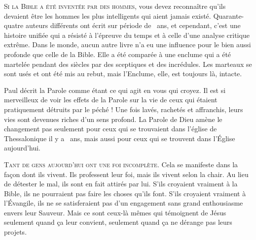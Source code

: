 \lettrine{S}{i la Bible a été inventée par des hommes,} vous devez reconnaître
 qu'ils devaient être les hommes les plus intelligents qui aient jamais existé.
 Quarante-quatre auteurs différents ont écrit
 sur période de ~ans, et cependant, c'est une histoire unifiée
 qui a résisté à l'épreuve du temps et à celle d'une analyse critique extrême.
 Dans le monde, aucun autre livre n'a eu une influence pour le bien aussi
 profonde que celle de la Bible. Elle a été comparée à une enclume
 qui a été martelée pendant des siècles par des sceptiques et des incrédules.
 Les marteaux se sont usés et ont été mis au rebut, mais l'Enclume,
 elle, est toujours là, intacte.


Paul décrit la Parole comme étant ce qui \og agit en vous qui croyez. \fg{}
 Il est si merveilleux de voir les effets de la Parole sur la vie
 de ceux qui étaient pratiquement détruits par le péché !
 Une fois lavés, rachetés et affranchis, leurs vies sont devenues
 riches d'un sens profond. La Parole de Dieu amène le changement
 \ocadr pas seulement pour ceux qui se trouvaient dans l'église
 de Thessalonique il y a ~ans, mais aussi pour ceux
 qui se trouvent dans l'Église  aujourd'hui.

\dvrule






\lettrine{T}{ant de gens aujourd'hui ont une foi incomplète.}
 Cela se manifeste dans la façon dont ils vivent. Ils professent leur foi,
 mais ils vivent selon la chair. Au lieu de détester le mal,
 ils sont en fait attirés par lui. S'ils croyaient vraiment à la Bible,
 ils ne pourraient pas faire les choses qu'ils font.
 S'ils croyaient vraiment à l'Évangile, ils ne se satisferaient pas
 d'un engagement sans grand enthousiasme envers leur Sauveur.
 Mais ce sont ceux-là mêmes qui témoignent de Jésus seulement
 quand ça leur convient, seulement quand ça ne dérange pas leurs projets.

